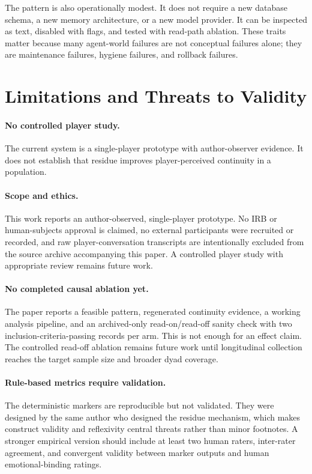 \documentclass[11pt]{article}
\begin{document}
The pattern is also operationally modest. It does not require a new database schema, a new memory architecture, or a new model provider. It can be inspected as text, disabled with flags, and tested with read-path ablation. These traits matter because many agent-world failures are not conceptual failures alone; they are maintenance failures, hygiene failures, and rollback failures.

\section{Limitations and Threats to Validity}

\paragraph{No controlled player study.}
The current system is a single-player prototype with author-observer evidence. It does not establish that residue improves player-perceived continuity in a population.

\paragraph{Scope and ethics.}
This work reports an author-observed, single-player prototype. No IRB or
human-subjects approval is claimed, no external participants were recruited or
recorded, and raw player-conversation transcripts are intentionally excluded
from the source archive accompanying this paper. A controlled player study with
appropriate review remains future work.

\paragraph{No completed causal ablation yet.}
The paper reports a feasible pattern, regenerated continuity evidence, a working analysis pipeline, and an archived-only read-on/read-off sanity check with two inclusion-criteria-passing records per arm. This is not enough for an effect claim. The controlled read-off ablation remains future work until longitudinal collection reaches the target sample size and broader dyad coverage.

\paragraph{Rule-based metrics require validation.}
The deterministic markers are reproducible but not validated. They were designed by the same author who designed the residue mechanism, which makes construct validity and reflexivity central threats rather than minor footnotes. A stronger empirical version should include at least two human raters, inter-rater agreement, and convergent validity between marker outputs and human emotional-binding ratings.
\end{document}
